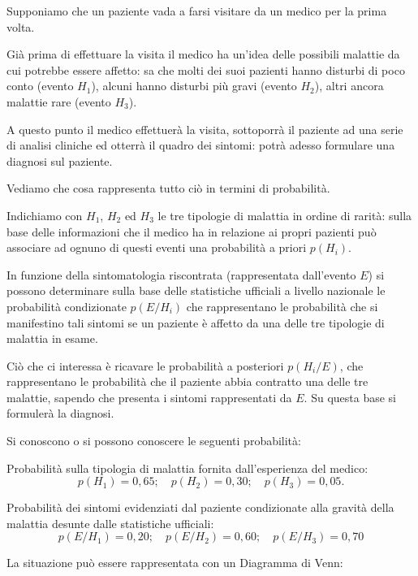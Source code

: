 \begin{exrig}
\begin{esempio}
Supponiamo che un paziente vada a farsi visitare da un medico per la
prima volta.

Già prima di effettuare la visita il medico ha un'idea delle possibili
malattie da cui potrebbe essere affetto: sa che molti dei suoi pazienti
hanno disturbi di poco conto (evento $ H_1 $), alcuni hanno disturbi più
gravi (evento $ H_2 $), altri ancora malattie rare (evento $ H_3 $).

A questo punto il medico effettuerà la visita, sottoporrà il paziente ad
una serie di analisi cliniche ed otterrà il quadro dei sintomi: potrà
adesso formulare una diagnosi sul paziente.

Vediamo che cosa rappresenta tutto ciò in termini di probabilità.

Indichiamo con $ H_1 $, $ H_2 $ ed $ H_3 $ le tre tipologie di malattia in ordine di
rarità: sulla base delle informazioni che il medico ha in relazione ai
propri pazienti può associare ad ognuno di questi eventi una
probabilità a priori $ p(H_i) $.

In funzione della sintomatologia riscontrata (rappresentata dall'evento
$ E $) si possono determinare sulla base delle statistiche ufficiali a
livello nazionale le probabilità condizionate $ p(E/H_i) $ che rappresentano
le probabilità che si manifestino tali sintomi se un paziente è affetto
da una delle tre tipologie di malattia in esame.

Ciò che ci interessa è ricavare le probabilità a posteriori $ p(H_i/E) $, che
rappresentano le probabilità che il paziente abbia contratto una delle
tre malattie, sapendo che presenta i sintomi rappresentati da $ E $. Su
questa base si formulerà la diagnosi.

Si conoscono o si possono conoscere le seguenti probabilità:

Probabilità sulla tipologia di malattia fornita
dall'esperienza del medico:
\[p(H_{1})=0,65;\quad p(H_{2})=0,30;\quad p(H_{3})=0,05.\]

Probabilità dei sintomi evidenziati dal paziente condizionate alla
gravità della malattia desunte dalle statistiche ufficiali: 
\[p(E/H_{1})=0,20;\quad p(E/H_{2})=0,60;\quad p(E/H_{3})=0,70 \]

La situazione può essere rappresentata con un Diagramma di Venn:
\begin{center}
 
\end{center}


\end{esempio}
\end{exrig}
